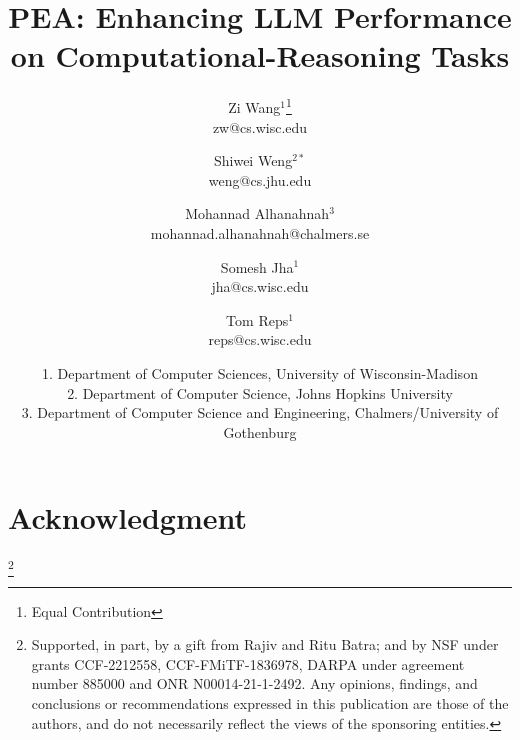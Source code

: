 \documentclass[11pt]{article} %
\title{PEA: Enhancing LLM Performance on Computational-Reasoning Tasks}
\author{\small 
  \hspace{-2em} Zi Wang$^1$\footnote{Equal Contribution} \vspace{-0.4em}\\ \hspace{-2em}\scriptsize zw@cs.wisc.edu
  \and \hspace{-2em} \small Shiwei Weng$^{2*}$\vspace{-0.4em}\\\hspace{-2em}  \scriptsize weng@cs.jhu.edu
  \and \hspace{-2em} \small Mohannad Alhanahnah$^3$ \vspace{-0.4em}\\ \hspace{-2em}\scriptsize mohannad.alhanahnah@chalmers.se
  \and \hspace{-2em} \small Somesh Jha$^1$ \vspace{-0.4em}\\ \hspace{-2em}\scriptsize jha@cs.wisc.edu
  \and \hspace{-2em} \small Tom Reps$^1$ \vspace{-0.4em}\\ \hspace{-2em}\scriptsize reps@cs.wisc.edu\\
}
\date{\footnotesize 1. Department of Computer Sciences, University of Wisconsin-Madison\\
 \footnotesize 2. Department of Computer Science, Johns Hopkins University\\
\footnotesize 3. Department of Computer Science and Engineering, Chalmers/University of Gothenburg \\}
\begin{document}
\maketitle





%

%

\section*{Acknowledgment}
\thanks{Supported, in part,
by a gift from Rajiv and Ritu Batra; and by NSF under grants CCF-2212558, CCF-FMiTF-1836978, DARPA under agreement number 885000 and ONR N00014-21-1-2492.
%
Any opinions, findings, and conclusions or recommendations expressed in this publication are those of the authors, and do not necessarily reflect the views of the sponsoring entities.
}




    
\appendix


\end{document}
